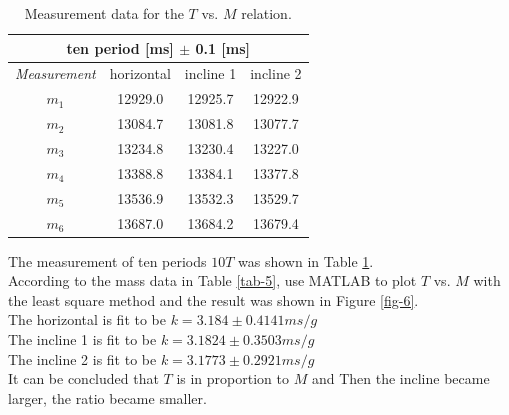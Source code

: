 \documentclass{article}
\begin{document}
\begin{table}[!h]
\begin{center}
\begin{tabular}{|c|c|c|c|}
\hline
\multicolumn{4}{|c|}{ten period [ms] $\pm$ 0.1 [ms]}\\
\hline
\textit{Measurement} & horizontal & incline 1 & incline 2\\
\hline
$m_1$	&	12929.0	&	12925.7	&	12922.9\\
$m_2$	&	13084.7	&	13081.8	&	13077.7\\
$m_3$	&	13234.8	&	13230.4	&	13227.0\\
$m_4$	&	13388.8	&	13384.1	&	13377.8\\
$m_5$	&	13536.9	&	13532.3	&	13529.7\\
$m_6$	&	13687.0	&	13684.2	&	13679.4\\
\hline
\end{tabular}
\caption{Measurement data for the $T$ vs. $M$ relation.}
\label{tab-2}
\end{center}
\end{table}

The measurement of ten periods $10T$ was shown in Table \ref{tab-2}.\\

According to the mass data in Table \ref{tab-5}, use MATLAB to plot $T$ vs. $M$ with the least square method and the result was shown in Figure \ref{fig-6}.\\

The horizontal is fit to be $k=3.184\pm0.4141ms/g$\\

The incline 1 is fit to be $k=3.1824\pm0.3503ms/g$\\

The incline 2 is fit to be $k=3.1773\pm0.2921ms/g$\\

It can be concluded that $T$ is in proportion to $M$ and Then the incline became larger, the ratio became smaller.
\end{document}

